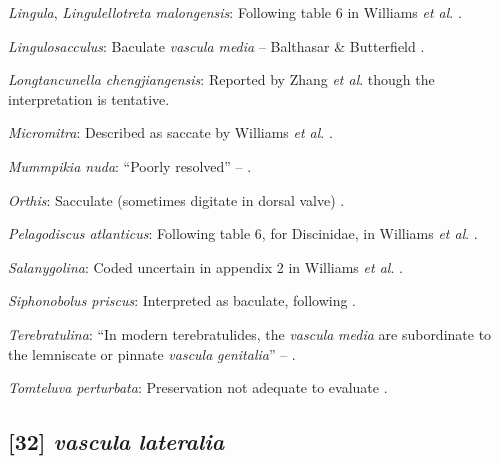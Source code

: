 \documentclass[openany]{book}
\theoremstyle{definition}
\theoremstyle{definition}
\theoremstyle{definition}
\theoremstyle{remark}
\begin{document}
\hypertarget{Lingula-coding-31}{}
\emph{Lingula}, \emph{Lingulellotreta malongensis}: Following table 6 in
Williams \emph{et al}.
\citeyearpar{Williams2000LinguliformeaCraniiformea}.

\hypertarget{Lingulosacculus-coding-31}{}
\emph{Lingulosacculus}: Baculate \emph{vascula} \emph{media} --
Balthasar \& Butterfield \citeyearpar{Balthasar2009EarlyCambrian}.

\hypertarget{Longtancunella_chengjiangensis-coding-31}{}
\emph{Longtancunella chengjiangensis}: Reported by Zhang \emph{et al}.
\citeyearpar[2011T]{Zhang2007Agregarious} though the interpretation is
tentative.

\hypertarget{Micromitra-coding-31}{}
\emph{Micromitra}: Described as saccate by Williams \emph{et al}.
\citeyearpar{Williams1998Thediversity}.

\hypertarget{Mummpikia_nuda-coding-31}{}
\emph{Mummpikia nuda}: ``Poorly resolved'' --
\citet{Balthasar2008iMummpikia}.

\hypertarget{Orthis-coding-31}{}
\emph{Orthis}: Sacculate (sometimes digitate in dorsal valve)
\citep[p716]{Williams2000LinguliformeaCraniiformea}.

\hypertarget{Pelagodiscus_atlanticus-coding-31}{}
\emph{Pelagodiscus atlanticus}: Following table 6, for Discinidae, in
Williams \emph{et al}.
\citeyearpar{Williams2000LinguliformeaCraniiformea}.

\hypertarget{Salanygolina-coding-31}{}
\emph{Salanygolina}: Coded uncertain in appendix 2 in Williams \emph{et
al}. \citeyearpar{Williams1998Thediversity}.

\hypertarget{Siphonobolus_priscus-coding-31}{}
\emph{Siphonobolus priscus}: Interpreted as baculate, following
\citet{Havlicek1982LingulaceaPaterinacea}.

\hypertarget{Terebratulina-coding-31}{}
\emph{Terebratulina}: ``In modern terebratulides, the \emph{vascula}
\emph{media} are subordinate to the lemniscate or pinnate \emph{vascula}
\emph{genitalia}'' -- \citet{Williams1997Introduction}.

\hypertarget{Tomteluva_perturbata-coding-31}{}
\emph{Tomteluva perturbata}: Preservation not adequate to evaluate
\citep{Streng2016Anew}.

\subsection*{\texorpdfstring{{[}32{]} \emph{vascula}
\emph{lateralia}}{{[}32{]} vascula lateralia}}\label{vascula-lateralia}
\end{document}
